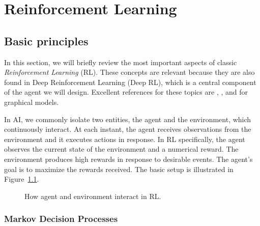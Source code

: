 \chapter{Reinforcement Learning}

\label{ch:rl}

\section{Basic principles}

\label{sec:rl}

In this section, we will briefly review the most important aspects of classic
\emph{Reinforcement Learning} (RL).
These concepts are relevant because they are also found in Deep Reinforcement
Learning (Deep RL), which is a central component of the agent we will design.
Excellent references for these topics are \cite{bib:rl-book},
\cite{bib:probabilistic-rl}, and \cite{bib:ml-book-murphy} for graphical
models.

In AI, we commonly isolate two entities, the agent and the environment, which
continuously interact. At each instant, the agent receives observations from
the environment and it executes actions in response. In RL specifically, the
agent observes the current state of the environment and a numerical reward.
The environment produces high rewards in response to desirable events. The
agent's goal is to maximize the rewards received. The basic setup is
illustrated in Figure~\ref{fig:rl}.

\begin{figure}
	\centering
	\caption{How agent and environment interact in RL.}
	\label{fig:rl}
\end{figure}


\subsection{Markov Decision Processes}

